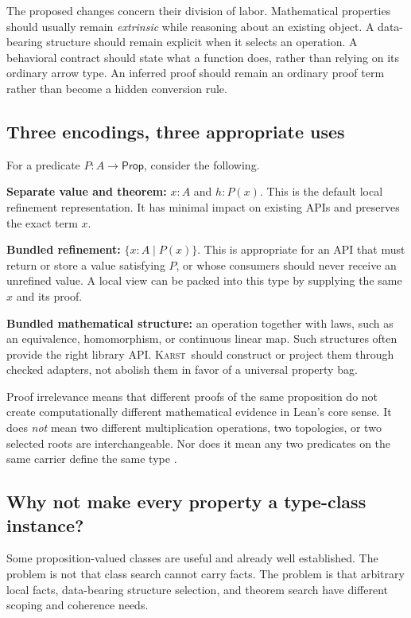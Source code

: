 \documentclass[11pt,letterpaper]{article}
\newcommand{\Karst}{\textsc{Karst}}
\newcommand{\Prop}{\mathsf{Prop}}
\theoremstyle{remark}
\begin{document}
The proposed changes concern their division of labor. Mathematical properties
should usually remain \emph{extrinsic} while reasoning about an existing
object. A data-bearing structure should remain explicit when it selects an
operation. A behavioral contract should state what a function does, rather than
relying on its ordinary arrow type. An inferred proof should remain an ordinary
proof term rather than become a hidden conversion rule.

\subsection{Three encodings, three appropriate uses}
For a predicate $P:A\to\Prop$, consider the following.

\textbf{Separate value and theorem:} $x:A$ and $h:P(x)$. This is the default
local refinement representation. It has minimal impact on existing APIs and
preserves the exact term $x$.

\textbf{Bundled refinement:} $\{x:A\mid P(x)\}$. This is appropriate for an API
that must return or store a value satisfying $P$, or whose consumers should
never receive an unrefined value. A local view can be packed into this type by
supplying the same $x$ and its proof.

\textbf{Bundled mathematical structure:} an operation together with laws, such
as an equivalence, homomorphism, or continuous linear map. Such structures often
provide the right library API. \Karst\ should construct or project them
through checked adapters, not abolish them in favor of a universal property
bag.

Proof irrelevance means that different proofs of the same proposition do not
create computationally different mathematical evidence in Lean's core sense.
It does \emph{not} mean two different multiplication operations, two topologies,
or two selected roots are interchangeable. Nor does it mean any two predicates
on the same carrier define the same type \cite{leansubtypes,leantypes}.

\subsection{Why not make every property a type-class instance?}
Some proposition-valued classes are useful and already well established.
The problem is not that class search cannot carry facts. The problem is that
arbitrary local facts, data-bearing structure selection, and theorem search
have different scoping and coherence needs.
\end{document}
